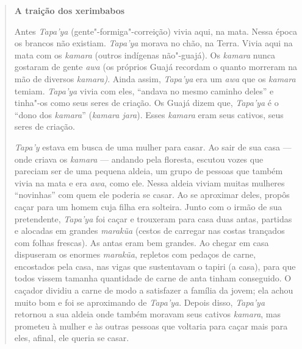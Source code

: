 \begin{quote}
\textbf{A traição dos xerimbabos}

Antes \emph{Tapa'ya} (gente"-formiga"-correição) vivia aqui, na mata.
Nessa época os brancos não existiam. \emph{Tapa'ya} morava no chão, na
Terra. Vivia aqui na mata com os \emph{kamara} (outros indígenas
não"-guajá). Os \emph{kamara} nunca gostaram de gente \emph{awa} (os
próprios Guajá recordam o quanto morreram na mão de diversos
\emph{kamara)}. Ainda assim, \emph{Tapa'ya} era um \emph{awa} que os
\emph{kamara} temiam. \emph{Tapa'ya} vivia com eles, ``andava no mesmo
caminho deles'' e tinha"-os como seus seres de criação. Os Guajá dizem
que, \emph{Tapa'ya} é o ``dono dos \emph{kamara}'' (\emph{kamara jara}).
Esses \emph{kamara} eram seus cativos, seus seres de criação.

\emph{Tapa'y} estava em busca de uma mulher para casar. Ao sair de sua
casa --- onde criava os \emph{kamara} --- andando pela floresta, escutou
vozes que pareciam ser de uma pequena aldeia, um grupo de pessoas que
também vivia na mata e era \emph{awa}, como ele. Nessa aldeia viviam
muitas mulheres ``novinhas'' com quem ele poderia se casar. Ao se
aproximar deles, propôs caçar para um homem cuja filha era solteira.
Junto com o irmão de sua pretendente, \emph{Tapa'ya} foi caçar e
trouxeram para casa duas antas, partidas e alocadas em grandes
\emph{marakũa} (cestos de carregar nas costas trançados com folhas
frescas). As antas eram bem grandes. Ao chegar em casa dispuseram os
enormes \emph{marakũa}, repletos com pedaços de carne, encostados pela
casa, nas vigas que sustentavam o tapiri (a casa), para que todos vissem
tamanha quantidade de carne de anta tinham conseguido. O caçador dividiu
a carne de modo a satisfazer a família da jovem; ela achou muito bom e
foi se aproximando de \emph{Tapa'ya}. Depois disso, \emph{Tapa'ya}
retornou a sua aldeia onde também moravam seus cativos \emph{kamara},
mas prometeu à mulher e às outras pessoas que voltaria para caçar mais
para eles, afinal, ele queria se casar.


\end{quote}
